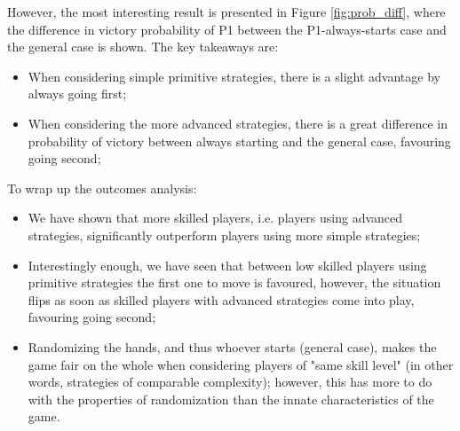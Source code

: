 However, the most interesting result is presented in Figure \ref{fig:prob_diff}, where the difference in victory probability of P1 between the P1-always-starts case and the general case is shown. The key takeaways are:
\begin{itemize}
	\item When considering simple primitive strategies, there is a slight advantage by always going first;
	\item When considering the more advanced strategies, there is a great difference in probability of victory between always starting and the general case, favouring going second;
\end{itemize}

To wrap up the outcomes analysis:
\begin{itemize}
	\item We have shown that more skilled players, i.e. players using advanced strategies, significantly outperform players using more simple strategies;
	\item Interestingly enough, we have seen that between low skilled players using primitive strategies the first one to move is favoured, however, the situation flips as soon as skilled players with advanced strategies come into play, favouring going second;
	\item Randomizing the hands, and thus whoever starts (general case), makes the game fair on the whole when considering players of "same skill level" (in other words, strategies of comparable complexity); however, this has more to do with the properties of randomization than the innate characteristics of the game.
\end{itemize}